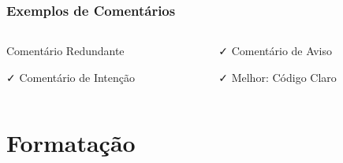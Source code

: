 \documentclass[aspectratio=169]{beamer}
\begin{document}
\begin{frame}
\frametitle{Exemplos de Comentários}

\begin{columns}
\begin{column}{0.5\textwidth}
\begin{block}{\textcolor{cleanred}{\faTimes} Comentário Redundante}

\end{block}

\vspace{0.3cm}
\begin{block}{\textcolor{cleangreen}{\faCheck} Comentário de Intenção}

\end{block}
\end{column}

\begin{column}{0.5\textwidth}
\begin{block}{\textcolor{cleangreen}{\faCheck} Comentário de Aviso}

\end{block}

\vspace{0.3cm}
\begin{block}{\textcolor{cleangreen}{\faCheck} Melhor: Código Claro}

\end{block}
\end{column}
\end{columns}
\end{frame}

\section{Formatação}
\end{document}
